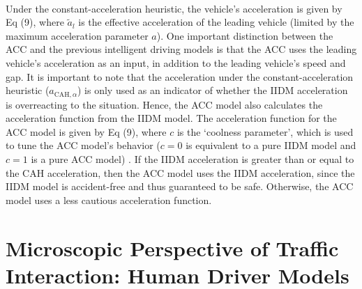 \documentclass[12pt]{article}
\begin{document}
\paragraph{}
Under the constant-acceleration heuristic, the vehicle's acceleration is given by Eq (9), where $\tilde{a}_l$ is the effective acceleration of the leading vehicle (limited by the maximum acceleration parameter $a$). One important distinction between the ACC and the previous intelligent driving models is that the ACC uses the leading vehicle's acceleration as an input, in addition to the leading vehicle's speed and gap. It is important to note that the  acceleration under the constant-acceleration heuristic ($a_{\text{CAH},\alpha}$) is only used as an indicator of whether the IIDM acceleration is overreacting to the situation.  Hence, the ACC model also calculates the acceleration function from the IIDM model.  The acceleration function for the ACC model is given by Eq (9), where $c$ is the `coolness parameter', which is used to tune the ACC model's behavior ($c=0$ is equivalent to a pure IIDM model and $c=1$ is a pure ACC model) \cite[Chapter~11]{treiber_kesting_2013}.  If the IIDM acceleration is greater than or equal to the CAH acceleration, then the ACC model uses the IIDM acceleration, since the IIDM model is accident-free and thus guaranteed to be safe.  Otherwise, the ACC model uses a less cautious acceleration function.
\section{Microscopic Perspective of Traffic Interaction: Human Driver Models}
\end{document}
